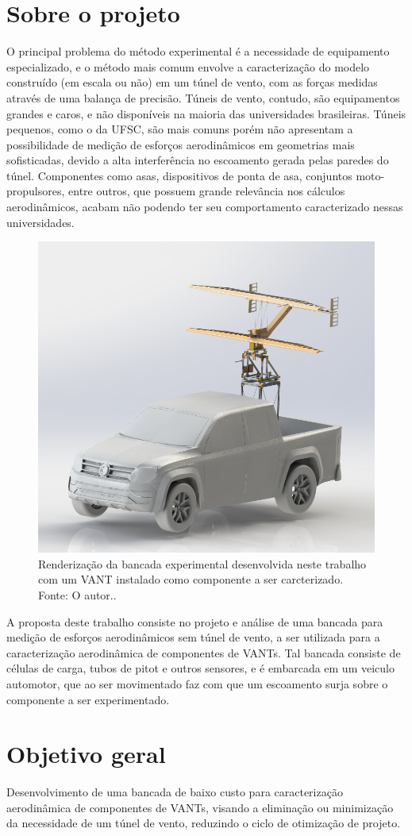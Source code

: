 \section{Sobre o projeto}

O principal problema do método experimental é a necessidade de equipamento especializado, e o método mais comum envolve a caracterização do modelo construído (em escala ou não) em um túnel de vento, com as forças medidas através de uma balança de precisão. Túneis de vento, contudo, são equipamentos grandes e caros, e não disponíveis na maioria das universidades brasileiras. Túneis pequenos, como o da UFSC, são mais comuns porém não apresentam a possibilidade de medição de esforços aerodinâmicos em geometrias mais sofisticadas, devido a alta interferência no escoamento gerada pelas paredes do túnel. Componentes como asas, dispositivos de ponta de asa, conjuntos moto-propulsores, entre outros, que possuem grande relevância nos cálculos aerodinâmicos, acabam não podendo ter seu comportamento caracterizado nessas universidades.

\begin{figure}[!ht]
    \centering
    \includegraphics[width=.8\linewidth]{figuras/renders/aviao_no_carro.png}
    \caption{Renderização da bancada experimental desenvolvida neste trabalho com um VANT instalado como componente a ser carcterizado. Fonte: O autor..}
    \label{fig:render_bancada_aviao_carro}
\end{figure}

A proposta deste trabalho consiste no projeto e análise de uma bancada para medição de esforços aerodinâmicos sem túnel de vento, a ser utilizada para a caracterização aerodinâmica de componentes de VANTs. Tal bancada consiste de células de carga, tubos de pitot e outros sensores, e é embarcada em um veiculo automotor, que ao ser movimentado faz com que um escoamento surja sobre o componente a ser experimentado.

\section{Objetivo geral}

Desenvolvimento de uma bancada de baixo custo para caracterização aerodinâmica de componentes de VANTs, visando a eliminação ou minimização da necessidade de um túnel de vento, reduzindo o ciclo de otimização de projeto.
